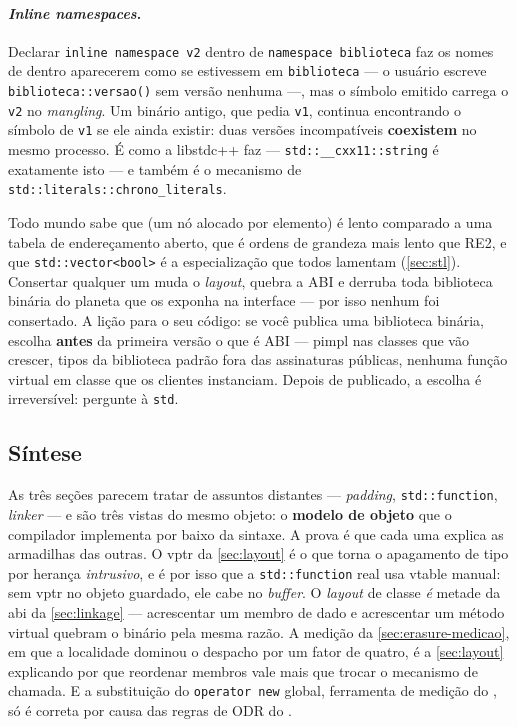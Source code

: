 \paragraph{\emph{Inline namespaces}.} Declarar \texttt{inline namespace v2}
dentro de \texttt{namespace biblioteca} faz os nomes de dentro aparecerem como
se estivessem em \texttt{biblioteca} --- o usuário escreve
\texttt{biblioteca::versao()} sem versão nenhuma ---, mas o símbolo emitido
carrega o \texttt{v2} no \emph{mangling}. Um binário antigo, que pedia
\texttt{v1}, continua encontrando o símbolo de \texttt{v1} se ele ainda existir:
duas versões incompatíveis \textbf{coexistem} no mesmo processo. É como a
libstdc++ faz --- \texttt{std::\_\_cxx11::string} é exatamente isto --- e também
é o mecanismo de \texttt{std::literals::chrono\_literals}.

\begin{regra}
Todo mundo sabe que  (um nó alocado por elemento) é
lento comparado a uma tabela de endereçamento aberto, que  é
ordens de grandeza mais lento que RE2, e que \texttt{std::vector<bool>} é a
especialização que todos lamentam (\cref{sec:stl}). Consertar qualquer um muda o
\emph{layout}, quebra a ABI e derruba toda biblioteca binária do planeta que os
exponha na interface --- por isso nenhum foi consertado. A lição para o seu
código: se você publica uma biblioteca binária, escolha \textbf{antes} da
primeira versão o que é ABI --- pimpl nas classes que vão crescer, tipos da
biblioteca padrão fora das assinaturas públicas, nenhuma função virtual em
classe que os clientes instanciam. Depois de publicado, a escolha é
irreversível: pergunte à \texttt{std}.
\end{regra}

\subsection{Síntese}

As três seções parecem tratar de assuntos distantes --- \emph{padding},
\texttt{std::function}, \emph{linker} --- e são três vistas do mesmo objeto: o
\textbf{modelo de objeto} que o compilador implementa por baixo da sintaxe. A
prova é que cada uma explica as armadilhas das outras. O vptr da
\cref{sec:layout} é o que torna o apagamento de tipo por herança
\emph{intrusivo}, e é por isso que a \texttt{std::function} real usa vtable
manual: sem vptr no objeto guardado, ele cabe no \emph{buffer}. O \emph{layout}
de classe \emph{é} metade da \gls{abi} da \cref{sec:linkage} --- acrescentar um
membro de dado e acrescentar um método virtual quebram o binário pela mesma
razão. A medição da \cref{sec:erasure-medicao}, em que a localidade dominou o
despacho por um fator de quatro, é a \cref{sec:layout} explicando por que
reordenar membros vale mais que trocar o mecanismo de chamada. E a substituição
do \texttt{operator new} global, ferramenta de medição do
, só é correta por causa das regras de ODR do
.

